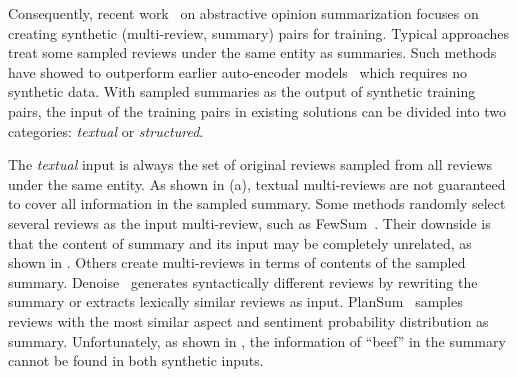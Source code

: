 
Consequently, recent work~\cite{Copycat20, Denoise20, 
Fewshot20, Plansum20} 
on abstractive opinion summarization focuses on 
creating synthetic (multi-review, summary) pairs for training.
Typical approaches treat some sampled reviews under the same entity as summaries.
Such methods have showed to outperform
earlier auto-encoder models~\cite{MeanSum19} which requires no
synthetic data. 
With sampled summaries as the output of synthetic training pairs, 
the input of the training pairs in existing solutions can be divided into two categories: {\em textual} or  {\em structured}.

The {\em textual} input is always the set of original reviews sampled from all reviews
under the same entity.
As shown in  (a),
textual multi-reviews are not guaranteed to cover all information in the sampled summary.
Some methods
randomly select several reviews as the input multi-review,
such as FewSum~\cite{Fewshot20}.
Their downside is that the content of summary 
and its input may be completely unrelated, as shown in 
. 
Others create multi-reviews in terms of contents of the sampled summary. 
Denoise~\cite{Denoise20} generates syntactically different reviews by rewriting the summary or 
extracts lexically similar reviews as input. 
PlanSum~\cite{Plansum20} samples reviews with the most similar aspect and sentiment probability distribution as summary.
Unfortunately, as shown in  ,
the information of ``beef'' in the summary cannot be found in both synthetic inputs.


